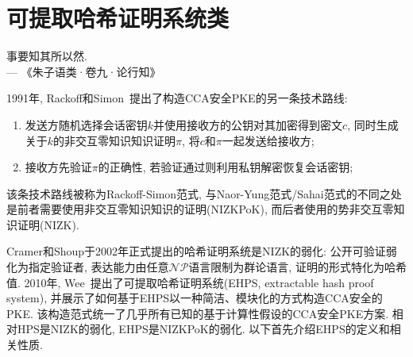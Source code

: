 \section{可提取哈希证明系统类}
\begin{center}
    事要知其所以然.  \\
                \hfill --- 《朱子语类·卷九·论行知》
\end{center}


1991年, Rackoff和Simon~\cite{RS-CRYPTO-1991}提出了构造CCA安全PKE的另一条技术路线: 
\begin{enumerate}
	\item 发送方随机选择会话密钥$k$并使用接收方的公钥对其加密得到密文$c$, 同时生成关于$k$的非交互零知识知识证明$\pi$, 将$c$和$\pi$一起发送给接收方;  
	\item 接收方先验证$\pi$的正确性, 若验证通过则利用私钥解密恢复会话密钥; 
\end{enumerate}
该条技术路线被称为Rackoff-Simon范式, 与Naor-Yung范式/Sahai范式的不同之处是前者需要使用非交互零知识知识的证明(NIZKPoK), 而后者使用的势非交互零知识证明(NIZK). 

Cramer和Shoup于2002年正式提出的哈希证明系统是NIZK的弱化: 公开可验证弱化为指定验证者, 表达能力由任意$\mathcal{NP}$语言限制为群论语言, 证明的形式特化为哈希值. 
2010年, Wee~\cite{Wee-CRYPTO-2010}提出了可提取哈希证明系统(EHPS, extractable hash proof system), 
并展示了如何基于EHPS以一种简洁、模块化的方式构造CCA安全的PKE. 该构造范式统一了几乎所有已知的基于计算性假设的CCA安全PKE方案.  
相对HPS是NIZK的弱化, EHPS是NIZKPoK的弱化. 以下首先介绍EHPS的定义和相关性质. 

